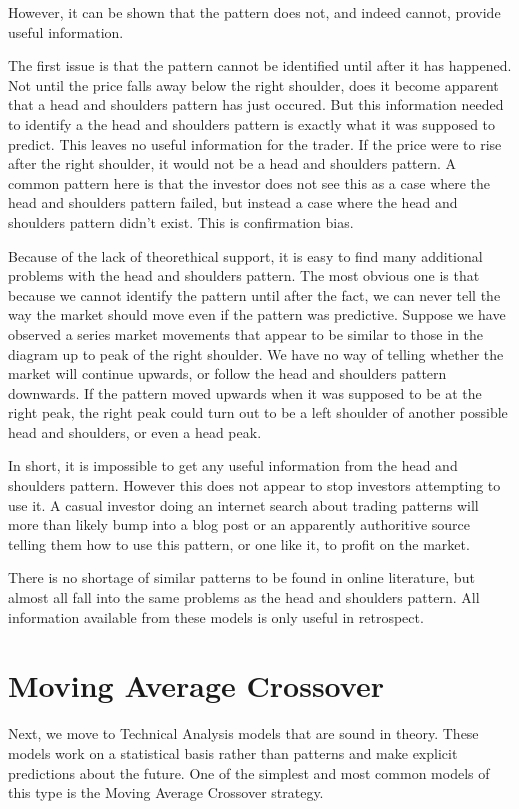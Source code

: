 \documentclass{report}
\begin{document}
However, it can be shown that the pattern does not, and indeed cannot, provide useful information. 

The first issue is that the pattern cannot be identified until after it has happened. Not until the price falls away below the right shoulder, does it become apparent that a head and shoulders pattern has just occured. But this information needed to identify a the head and shoulders pattern is exactly what it was supposed to predict. This leaves no useful information for the trader. If the price were to rise after the right shoulder, it would not be a head and shoulders pattern. A common pattern here is that the investor does not see this as a case where the head and shoulders pattern failed, but instead a case where the head and shoulders pattern didn't exist. This is confirmation bias.

Because of the lack of theorethical support, it is easy to find many additional problems with the head and shoulders pattern. The most obvious one is that because we cannot identify the pattern until after the fact, we can never tell the way the market should move even if the pattern was predictive. Suppose we have observed a series market movements that appear to be similar to those in the diagram up to peak of the right shoulder. We have no way of telling whether the market will continue upwards, or follow the head and shoulders pattern downwards. If the pattern moved upwards when it was supposed to be at the right peak, the right peak could turn out to be a left shoulder of another possible head and shoulders, or even a head peak.

In short, it is impossible to get any useful information from the head and shoulders pattern. However this does not appear to stop investors attempting to use it. A casual investor doing an internet search about trading patterns will more than likely bump into a blog post or an apparently authoritive source telling them how to use this pattern, or one like it, to profit on the market. 

There is no shortage of similar patterns to be found in online literature, but almost all fall into the same problems as the head and shoulders pattern. All information available from these models is only useful in retrospect. 

\section{Moving Average Crossover}

Next, we move to Technical Analysis models that are sound in theory. These models work on a statistical basis rather than patterns and make explicit predictions about the future. One of the simplest and most common models of this type is the Moving Average Crossover strategy.
\end{document}
